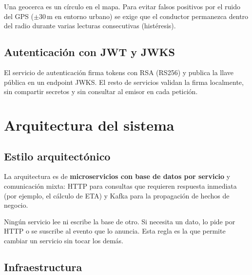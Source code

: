\documentclass[conference]{IEEEtran}
\begin{document}
Una geocerca es un círculo en el mapa. Para evitar falsos positivos por el ruido del GPS
($\pm 30$\,m en entorno urbano) se exige que el conductor permanezca dentro del radio durante
varias lecturas consecutivas (histéresis).

\subsection{Autenticación con JWT y JWKS}

El servicio de autenticación firma tokens con RSA (RS256) y publica la llave pública en un
endpoint JWKS. El resto de servicios validan la firma localmente, sin compartir secretos y sin
consultar al emisor en cada petición.

\clearpage
\section{Arquitectura del sistema}

\subsection{Estilo arquitectónico}

La arquitectura es de \textbf{microservicios con base de datos por servicio} y comunicación mixta:
HTTP para consultas que requieren respuesta inmediata (por ejemplo, el cálculo de ETA) y Kafka
para la propagación de hechos de negocio.

\begin{nota}
Ningún servicio lee ni escribe la base de otro. Si necesita un dato, lo pide por HTTP o se
suscribe al evento que lo anuncia. Esta regla es la que permite cambiar un servicio sin tocar los
demás.
\end{nota}

\subsection{Infraestructura}
\end{document}
